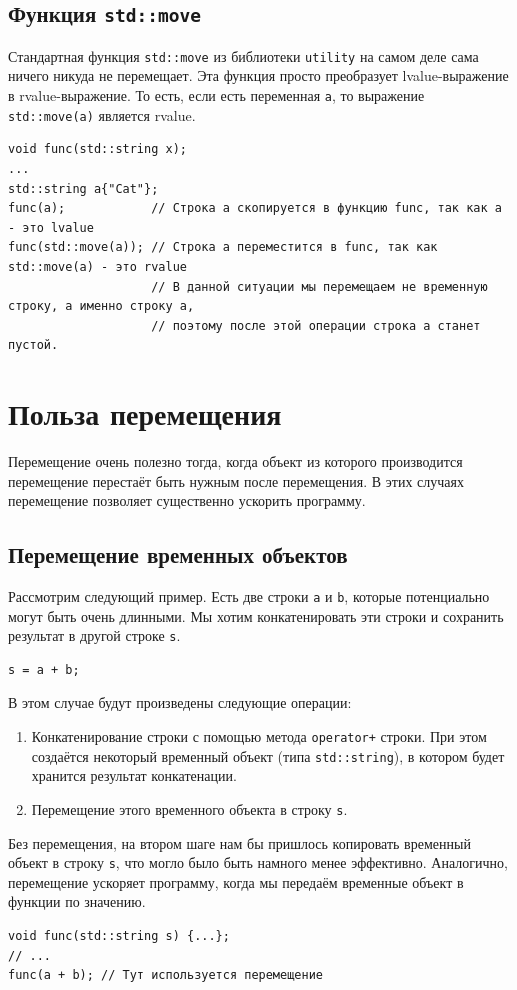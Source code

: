 \documentclass{article}
\begin{document}
\subsection*{Функция \texttt{std::move}}
Стандартная функция \texttt{std::move} из библиотеки \texttt{utility} на самом деле сама ничего никуда не перемещает. Эта функция просто преобразует lvalue-выражение в rvalue-выражение. То есть, если есть переменная \texttt{a}, то выражение \texttt{std::move(a)} является rvalue.
\begin{lstlisting}
void func(std::string x);
...
std::string a{"Cat"};
func(a);            // Строка a скопируется в функцию func, так как a - это lvalue
func(std::move(a)); // Строка a переместится в func, так как std::move(a) - это rvalue
                    // В данной ситуации мы перемещаем не временную строку, а именно строку a, 
                    // поэтому после этой операции строка a станет пустой.
\end{lstlisting}

\newpage



\newpage
\section*{Польза перемещения}
Перемещение очень полезно тогда, когда объект из которого производится перемещение перестаёт быть нужным после перемещения. В этих случаях перемещение позволяет существенно ускорить программу.
\subsection*{Перемещение временных объектов}
Рассмотрим следующий пример. Есть две строки \texttt{a} и \texttt{b}, которые потенциально могут быть очень длинными. Мы хотим конкатенировать эти строки и сохранить результат в другой строке \texttt{s}.
\begin{lstlisting}
s = a + b;
\end{lstlisting}
В этом случае будут произведены следующие операции:
\begin{enumerate}
\item Конкатенирование строки с помощью метода \texttt{operator+} строки. При этом создаётся некоторый временный объект (типа \texttt{std::string}), в котором будет хранится результат конкатенации.
\item Перемещение этого временного объекта в строку \texttt{s}.
\end{enumerate}
Без перемещения, на втором шаге нам бы пришлось копировать временный объект в строку \texttt{s}, что могло было быть намного менее эффективно.
Аналогично, перемещение ускоряет программу, когда мы передаём временные объект в функции по значению.
\begin{lstlisting}
void func(std::string s) {...};
// ...
func(a + b); // Тут используется перемещение
\end{lstlisting}
\end{document}
